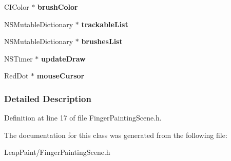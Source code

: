 \begin{DoxyCompactItemize}
\item 
\hypertarget{interface_finger_painting_scene_af83c54f1d8ddb6ed733144294b6e9634}{C\-I\-Color $\ast$ {\bfseries brush\-Color}}\label{dd/df0/interface_finger_painting_scene_af83c54f1d8ddb6ed733144294b6e9634}

\item 
\hypertarget{interface_finger_painting_scene_afd3ae925a75735b1c4ed442a758b57d9}{N\-S\-Mutable\-Dictionary $\ast$ {\bfseries trackable\-List}}\label{dd/df0/interface_finger_painting_scene_afd3ae925a75735b1c4ed442a758b57d9}

\item 
\hypertarget{interface_finger_painting_scene_ae7cd9b432bce54e233c8f991688df1ba}{N\-S\-Mutable\-Dictionary $\ast$ {\bfseries brushes\-List}}\label{dd/df0/interface_finger_painting_scene_ae7cd9b432bce54e233c8f991688df1ba}

\item 
\hypertarget{interface_finger_painting_scene_abfbce356d00c473f2b40cef5b01bce4c}{N\-S\-Timer $\ast$ {\bfseries update\-Draw}}\label{dd/df0/interface_finger_painting_scene_abfbce356d00c473f2b40cef5b01bce4c}

\item 
\hypertarget{interface_finger_painting_scene_a5e0af6290118f343b985444addf6aa40}{Red\-Dot $\ast$ {\bfseries mouse\-Cursor}}\label{dd/df0/interface_finger_painting_scene_a5e0af6290118f343b985444addf6aa40}

\end{DoxyCompactItemize}


\subsubsection{Detailed Description}


Definition at line 17 of file Finger\-Painting\-Scene.\-h.



The documentation for this class was generated from the following file\-:\begin{DoxyCompactItemize}
\item 
Leap\-Paint/Finger\-Painting\-Scene.\-h\end{DoxyCompactItemize}
